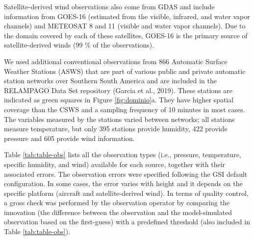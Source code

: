 \documentclass[final,5p,times,twocolumn,authoryear]{elsarticle} %
\begin{document}
Satellite-derived wind observations also come from GDAS and include information from GOES-16 (estimated from the visible, infrared, and water vapor channels) and METEOSAT 8 and 11 (visible and water vapor channels). Due to the domain covered by each of these satellites, GOES-16 is the primary source of satellite-derived winds (99 \% of the observations).

We used additional conventional observations from 866 Automatic Surface Weather Stations (ASWS) that are part of various public and private automatic station networks over Southern South America and are included in the RELAMPAGO Data Set repository (Garcia et al., 2019). These stations are indicated as green squares in Figure \ref{fig:dominio}a. They have higher spatial coverage than the CSWS and a sampling frequency of 10 minutes in most cases. The variables measured by the stations varied between networks; all stations measure temperature, but only 395 stations provide humidity, 422 provide pressure and 605 provide wind information.

Table \ref{tab:table-obs} lists all the observation types (i.e., pressure, temperature, specific humidity, and wind) available for each source, together with their associated errors. The observation errors were specified following the GSI default configuration. In some cases, the error varies with height and it depends on the specific platform (aircraft and satellite-derived wind). In terms of quality control, a gross check was performed by the observation operator by comparing the innovation (the difference between the observation and the model-simulated observation based on the first-guess) with a predefined threshold (also included in Table \ref{tab:table-obs}).
\end{document}
